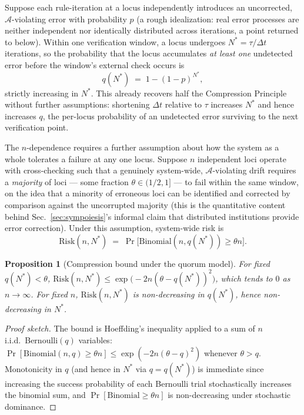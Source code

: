\documentclass[12pt,a4paper]{article}
\theoremstyle{plain}
\newtheorem{proposition}[theorem]{Proposition}
\theoremstyle{definition}
\theoremstyle{remark}
\newcommand{\Adm}{\mathcal{A}}
\begin{document}
Suppose each rule-iteration at a locus independently introduces an uncorrected, $\Adm$-violating error with probability $p$ (a rough idealization: real error processes are neither independent nor identically distributed across iterations, a point returned to below). Within one verification window, a locus undergoes $N^\ast = \tau/\Delta t$ iterations, so the probability that the locus accumulates \emph{at least one} undetected error before the window's external check occurs is
\[
q(N^\ast) \;=\; 1 - (1-p)^{N^\ast},
\]
strictly increasing in $N^\ast$. This already recovers half the Compression Principle without further assumptions: shortening $\Delta t$ relative to $\tau$ increases $N^\ast$ and hence increases $q$, the per-locus probability of an undetected error surviving to the next verification point.

The $n$-dependence requires a further assumption about how the system as a whole tolerates a failure at any one locus. Suppose $n$ independent loci operate with cross-checking such that a genuinely system-wide, $\Adm$-violating drift requires a \emph{majority} of loci — some fraction $\theta \in (1/2, 1]$ — to fail within the same window, on the idea that a minority of erroneous loci can be identified and corrected by comparison against the uncorrupted majority (this is the quantitative content behind Sec.~\ref{sec:sympoiesis}'s informal claim that distributed institutions provide error correction). Under this assumption, system-wide risk is
\[
\mathrm{Risk}(n, N^\ast) \;=\; \Pr\!\big[\mathrm{Binomial}(n, q(N^\ast)) \ge \theta n\big].
\]

\begin{proposition}[Compression bound under the quorum model]
\label{prop:compression-bound}
For fixed $q(N^\ast) < \theta$, $\mathrm{Risk}(n,N^\ast) \le \exp\!\big(-2n(\theta - q(N^\ast))^2\big)$, which tends to $0$ as $n \to \infty$. For fixed $n$, $\mathrm{Risk}(n, N^\ast)$ is non-decreasing in $q(N^\ast)$, hence non-decreasing in $N^\ast$.
\end{proposition}

\begin{proof}[Proof sketch]
The bound is Hoeffding's inequality applied to a sum of $n$ i.i.d.\ Bernoulli$(q)$ variables: $\Pr[\mathrm{Binomial}(n,q)\ge \theta n] \le \exp(-2n(\theta-q)^2)$ whenever $\theta > q$. Monotonicity in $q$ (and hence in $N^\ast$ via $q=q(N^\ast)$) is immediate since increasing the success probability of each Bernoulli trial stochastically increases the binomial sum, and $\Pr[\text{Binomial} \ge \theta n]$ is non-decreasing under stochastic dominance.
\end{proof}
\end{document}
